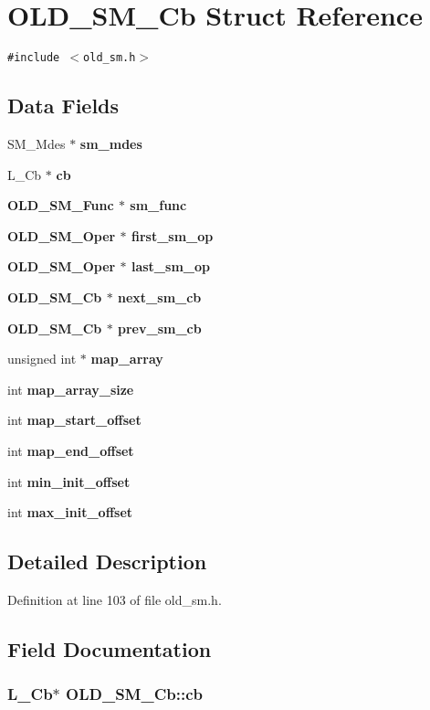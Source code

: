 \section{OLD\_\-SM\_\-Cb Struct Reference}
\label{structOLD__SM__Cb}
{\tt \#include $<$old\_\-sm.h$>$}

\subsection*{Data Fields}
\begin{CompactItemize}
\item 
SM\_\-Mdes $\ast$ \bf{sm\_\-mdes}
\item 
L\_\-Cb $\ast$ \bf{cb}
\item 
\bf{OLD\_\-SM\_\-Func} $\ast$ \bf{sm\_\-func}
\item 
\bf{OLD\_\-SM\_\-Oper} $\ast$ \bf{first\_\-sm\_\-op}
\item 
\bf{OLD\_\-SM\_\-Oper} $\ast$ \bf{last\_\-sm\_\-op}
\item 
\bf{OLD\_\-SM\_\-Cb} $\ast$ \bf{next\_\-sm\_\-cb}
\item 
\bf{OLD\_\-SM\_\-Cb} $\ast$ \bf{prev\_\-sm\_\-cb}
\item 
unsigned int $\ast$ \bf{map\_\-array}
\item 
int \bf{map\_\-array\_\-size}
\item 
int \bf{map\_\-start\_\-offset}
\item 
int \bf{map\_\-end\_\-offset}
\item 
int \bf{min\_\-init\_\-offset}
\item 
int \bf{max\_\-init\_\-offset}
\end{CompactItemize}


\subsection{Detailed Description}




Definition at line 103 of file old\_\-sm.h.

\subsection{Field Documentation}
\subsubsection{\setlength{\rightskip}{0pt plus 5cm}L\_\-Cb$\ast$ \bf{OLD\_\-SM\_\-Cb::cb}}\label{structOLD__SM__Cb_4b8ec599ad169f8a5cb0c0325866eb8d}




